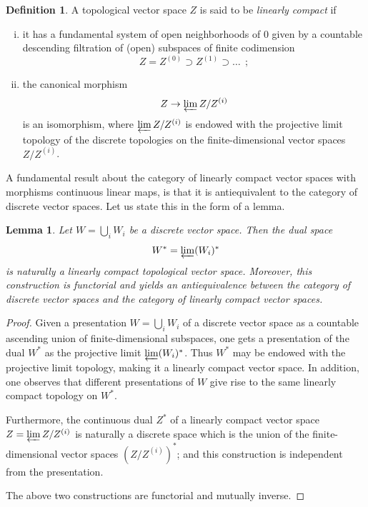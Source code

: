 \documentclass[12pt,reqno]{amsart}
\newtheorem{lem}[thm]{Lemma}
\theoremstyle{definition}
\newtheorem{defn}[thm]{Definition}
\theoremstyle{remark}
\begin{document}
	\begin{defn}
	  A topological vector space $Z$ is said to be \emph{linearly compact} if 
	\begin{enumerate}[(i)]
	    \item it has a fundamental system of open neighborhoods of $0$ given by a countable descending filtration of (open) subspaces of finite codimension
	    $$
	    Z = Z^{(0)} \supset Z^{(1)} \supset \ldots \ \ ;
	    $$
	    \item the canonical morphism 
	    $$
	    Z \rightarrow \varprojlim Z/Z^{(i)}
	    $$
	    is an isomorphism, where $\varprojlim Z/Z^{(i)}$ is endowed with the projective limit topology of the discrete topologies on the finite-dimensional vector spaces $Z/Z^{(i)}$.
	\end{enumerate}  
	\end{defn}
	
	A fundamental result about the category of linearly compact vector spaces with morphisms continuous linear maps, is that it is antiequivalent to the category of discrete vector spaces. Let us state this in the form of a lemma.
	
	\begin{lem} \label{lem:disc_lincomp}
    	 Let $W = \bigcup_i W_i$ be a discrete vector space. Then the dual space
    	$$W^\ast = \varprojlim (W_i)^\ast$$
    	is naturally a linearly compact topological vector space. Moreover, this construction is functorial and yields an antiequivalence between the category of discrete vector spaces and the category of linearly compact vector spaces.
    	\end{lem}
	\begin{proof}
	    Given a presentation $W = \bigcup_i W_i$ of a discrete vector space as a countable ascending union of finite-dimensional subspaces, one gets a presentation of the dual $W^\ast$ as the projective limit $\varprojlim (W_i)^\ast$. Thus $W^\ast$ may be endowed with the projective limit topology, making it a linearly compact vector space. In addition, one observes that different presentations of $W$ give rise to the same linearly compact topology on $W^\ast$. 
	    
	    Furthermore, the continuous dual $Z^\ast$ of a linearly compact vector space 
	    $Z = \varprojlim Z/Z^{(i)}$ is naturally a discrete space which is the union of the finite-dimensional vector spaces $(Z/Z^{(i)})^\ast$; and this construction is independent from the presentation.
	    
	    The above two constructions are functorial and mutually inverse.
	\end{proof}
	
\end{document}
